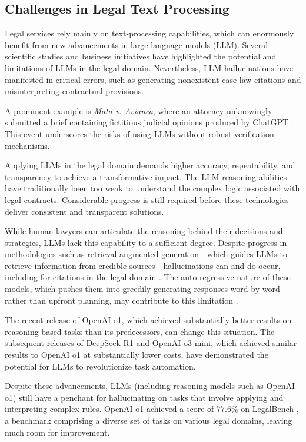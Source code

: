 \subsection{Challenges in Legal Text Processing}
Legal services rely mainly on text-processing capabilities, which can enormously benefit from new advancements in large language models (LLM). Several scientific studies and business initiatives have highlighted the potential and limitations of LLMs in the legal domain. Nevertheless, LLM hallucinations have manifested in critical errors, such as generating nonexistent case law citations and misinterpreting contractual provisions. 

A prominent example is \textit{Mata v. Avianca}, where an attorney unknowingly submitted a brief containing fictitious judicial opinions produced by ChatGPT \citep{Aidid2024}. This event underscores the risks of using LLMs without robust verification mechanisms. 

Applying LLMs in the legal domain demands higher accuracy, repeatability, and transparency to achieve a transformative impact. The LLM reasoning abilities have traditionally been too weak to understand the complex logic associated with legal contracts. Considerable progress is still required before these technologies deliver consistent and transparent solutions. 

While human lawyers can articulate the reasoning behind their decisions and strategies, LLMs lack this capability to a sufficient degree. Despite progress in methodologies such as retrieval augmented generation - which guides LLMs to retrieve information from credible sources - hallucinations can and do occur, including for citations in the legal domain \cite{magesh-2024}. The auto-regressive nature of these models, which pushes them into greedily generating responses word-by-word rather than upfront planning, may contribute to this limitation \cite{boraz-2024}. 

The recent release of OpenAI o1, which achieved substantially better results on reasoning-based tasks than its predecessors, can change this situation. The subsequent releases of DeepSeek R1 and OpenAI o3-mini, which achieved similar results to OpenAI o1 at substantially lower costs, have demonstrated the potential for  LLMs to revolutionize task automation. 

Despite these advancements, LLMs (including reasoning models such as OpenAI o1) still have a penchant for hallucinating on tasks that involve applying and interpreting complex rules. OpenAI o1 achieved a score of $77.6\%$ on LegalBench \cite{legalbench-2023, vals-2024}, a benchmark comprising a diverse set of tasks on various legal domains, leaving much room for improvement. 

